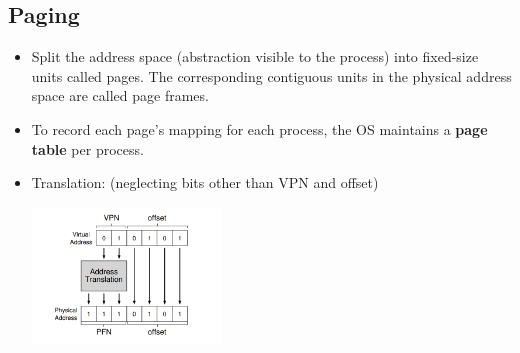 \documentclass[10pt]{report}
\begin{document}
\subsection{Paging}
\begin{itemize}
\item Split the address space (abstraction visible to the process) 
into fixed-size units called pages. The corresponding contiguous units in the physical address space are called page frames.
\item To record each page's mapping for each process, the OS
maintains a \textbf{page table} per process.
\item Translation: (neglecting bits other than VPN and offset)
\begin{center}
\includegraphics[width=5cm]{res/paging.png}
\end{center}
\end{itemize}
\end{document}
